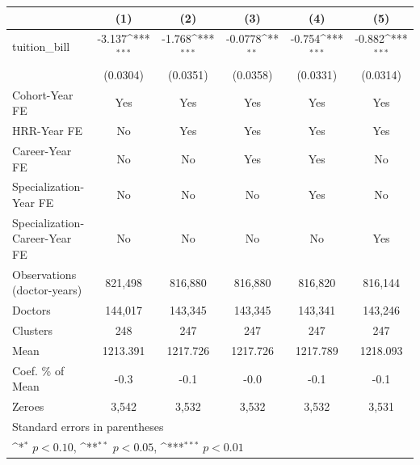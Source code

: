 {
\def\sym#1{\ifmmode^{#1}\else\(^{#1}\)\fi}
\begin{tabular}{l*{5}{c}}
\hline\hline
                    &\multicolumn{1}{c}{(1)}         &\multicolumn{1}{c}{(2)}         &\multicolumn{1}{c}{(3)}         &\multicolumn{1}{c}{(4)}         &\multicolumn{1}{c}{(5)}         \\
\hline
tuition\_bill        &      -3.137\sym{***}&      -1.768\sym{***}&     -0.0778\sym{**} &      -0.754\sym{***}&      -0.882\sym{***}\\
                    &    (0.0304)         &    (0.0351)         &    (0.0358)         &    (0.0331)         &    (0.0314)         \\
[1em]
Cohort-Year FE      &         Yes         &         Yes         &         Yes         &         Yes         &         Yes         \\
[1em]
HRR-Year FE         &          No         &         Yes         &         Yes         &         Yes         &         Yes         \\
[1em]
Career-Year FE      &          No         &          No         &         Yes         &         Yes         &          No         \\
[1em]
Specialization-Year FE&          No         &          No         &          No         &         Yes         &          No         \\
[1em]
Specialization-Career-Year FE&          No         &          No         &          No         &          No         &         Yes         \\
\hline
Observations (doctor-years)&     821,498         &     816,880         &     816,880         &     816,820         &     816,144         \\
Doctors             &     144,017         &     143,345         &     143,345         &     143,341         &     143,246         \\
Clusters            &         248         &         247         &         247         &         247         &         247         \\
Mean                &    1213.391         &    1217.726         &    1217.726         &    1217.789         &    1218.093         \\
Coef. \% of Mean    &        -0.3         &        -0.1         &        -0.0         &        -0.1         &        -0.1         \\
Zeroes              &       3,542         &       3,532         &       3,532         &       3,532         &       3,531         \\
\hline\hline
\multicolumn{6}{l}{\footnotesize Standard errors in parentheses}\\
\multicolumn{6}{l}{\footnotesize \sym{*} \(p<0.10\), \sym{**} \(p<0.05\), \sym{***} \(p<0.01\)}\\
\end{tabular}
}

